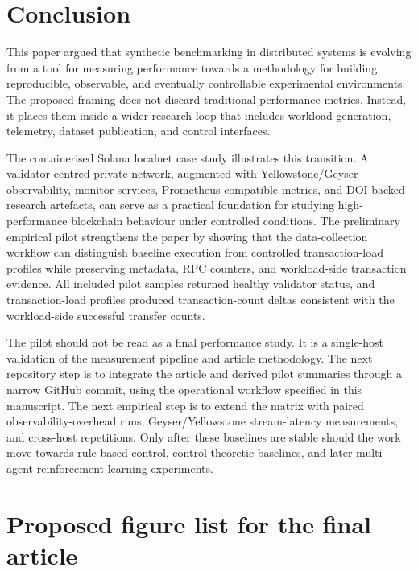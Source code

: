 \documentclass[11pt,a4paper]{article}
\newcommand{\artifacts}{artefacts}
\begin{document}
\section{Conclusion}
\label{sec:conclusion}

This paper argued that synthetic benchmarking in distributed systems is evolving from a tool for measuring performance towards a methodology for building reproducible, observable, and eventually controllable experimental environments. The proposed framing does not discard traditional performance metrics. Instead, it places them inside a wider research loop that includes workload generation, telemetry, dataset publication, and control interfaces.

The containerised Solana localnet case study illustrates this transition. A validator-centred private network, augmented with Yellowstone/Geyser observability, monitor services, Prometheus-compatible metrics, and DOI-backed research \artifacts{}, can serve as a practical foundation for studying high-performance blockchain behaviour under controlled conditions. The preliminary empirical pilot strengthens the paper by showing that the data-collection workflow can distinguish baseline execution from controlled transaction-load profiles while preserving metadata, RPC counters, and workload-side transaction evidence. All included pilot samples returned healthy validator status, and transaction-load profiles produced transaction-count deltas consistent with the workload-side successful transfer counts.

The pilot should not be read as a final performance study. It is a single-host validation of the measurement pipeline and article methodology. The next repository step is to integrate the article and derived pilot summaries through a narrow GitHub commit, using the operational workflow specified in this manuscript. The next empirical step is to extend the matrix with paired observability-overhead runs, Geyser/Yellowstone stream-latency measurements, and cross-host repetitions. Only after these baselines are stable should the work move towards rule-based control, control-theoretic baselines, and later multi-agent reinforcement learning experiments.

\appendix

\section{Proposed figure list for the final article}
\label{app:figure-list}
\end{document}
